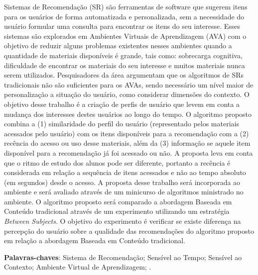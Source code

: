 



\begin{resumo}
  Sistemas de Recomendação (SR) são ferramentas de software que sugerem itens para os usuários de forma automatizada e personalizada,
  sem a necessidade do usuário formular uma consulta para encontrar os itens do seu interesse. Esses sistemas são
  explorados em Ambientes Virtuais de Aprendizagem (AVA) com o objetivo de reduzir alguns problemas existentes nesses ambientes
  quando a quantidade de materiais disponíveis é grande, tais como: sobrecarga cognitiva, dificuldade de encontrar os materiais
  do seu interesse e muitos materiais nunca serem utilizados. Pesquisadores da área argumentam que os algoritmos de SRs tradicionais não são suficientes para os AVAs,
  sendo necessário um nível maior de personalização a situação do usuário, como considerar dimensões do contexto. O objetivo
  desse trabalho é a criação de perfis de usuário que levem em conta a mudança dos interesses destes usuários
  ao longo do tempo. O algoritmo proposto combina a (1) similaridade do perfil do usuário (representado
  pelos materiais acessados pelo usuário) com os itens disponíveis para a recomendação com a (2) recência do acesso ou uso
  desse materiais, além da (3) informação se aquele item disponível para a recomendação já foi acessado ou não. A
  proposta leva em conta que o ritmo de estudo dos alunos pode ser diferente, portanto a recência é considerada em relação
  a sequência de itens acessados e não ao tempo absoluto (em segundos) desde o acesso. A proposta desse trabalho será
  incorporada ao ambiente \adaptweb e será avaliado através de um minicurso de algoritmos ministrado no ambiente.
  O algoritmo proposto será comparado a abordagem Baseada em Conteúdo tradicional através de um experimento utilizando um
  estratégia \textit{Between Subjects}. O objetivo do experimento é verificar se existe diferença na percepção do usuário
  sobre a qualidade das recomendações do algoritmo proposto em relação a abordagem Baseada em Conteúdo tradicional.

  \vspace{\onelineskip}

  \noindent
  \textbf{Palavras-chaves}: Sistema de Recomendação; Sensível ao Tempo; Sensível ao Contexto; Ambiente Virtual de Aprendizagem; \adaptweb.
\end{resumo}

